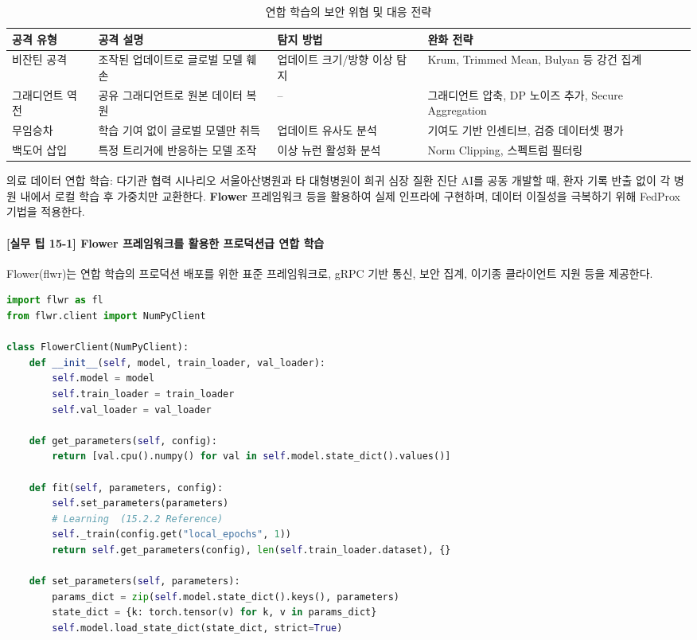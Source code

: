 \begin{table}[htbp]
\centering
\caption{연합 학습의 보안 위협 및 대응 전략}
\label{tab:fl_security_threats}
\begin{tabularx}{\textwidth}{p{2.5cm}Xp{3cm}X}
\toprule
\textbf{공격 유형} & \textbf{공격 설명} & \textbf{탐지 방법} & \textbf{완화 전략} \\
\midrule
비잔틴 공격 & 조작된 업데이트로 글로벌 모델 훼손 & 업데이트 크기/방향 이상 탐지 & Krum, Trimmed Mean, Bulyan 등 강건 집계 \\
그래디언트 역전 & 공유 그래디언트로 원본 데이터 복원 & -- & 그래디언트 압축, DP 노이즈 추가, Secure Aggregation \\
무임승차 & 학습 기여 없이 글로벌 모델만 취득 & 업데이트 유사도 분석 & 기여도 기반 인센티브, 검증 데이터셋 평가 \\
백도어 삽입 & 특정 트리거에 반응하는 모델 조작 & 이상 뉴런 활성화 분석 & Norm Clipping, 스펙트럼 필터링 \\
\bottomrule
\end{tabularx}
\end{table}

\begin{practicaltool}{의료 데이터 연합 학습: 다기관 협력 시나리오}
서울아산병원과 타 대형병원이 희귀 심장 질환 진단 AI를 공동 개발할 때, 환자 기록 반출 없이 각 병원 내에서 로컬 학습 후 가중치만 교환한다. \textbf{Flower} 프레임워크 등을 활용하여 실제 인프라에 구현하며, 데이터 이질성을 극복하기 위해 FedProx 기법을 적용한다.
\end{practicaltool}

\paragraph{[실무 팁 15-1] Flower 프레임워크를 활용한 프로덕션급 연합 학습}

Flower(flwr)는 연합 학습의 프로덕션 배포를 위한 표준 프레임워크로, gRPC 기반 통신, 보안 집계, 이기종 클라이언트 지원 등을 제공한다.

\begin{lstlisting}[language=Python, caption={Federated Learning Client Implementation based on Flower Framework}, label={lst:flower_client}]
import flwr as fl
from flwr.client import NumPyClient

class FlowerClient(NumPyClient):
    def __init__(self, model, train_loader, val_loader):
        self.model = model
        self.train_loader = train_loader
        self.val_loader = val_loader

    def get_parameters(self, config):
        return [val.cpu().numpy() for val in self.model.state_dict().values()]

    def fit(self, parameters, config):
        self.set_parameters(parameters)
        # Learning  (15.2.2 Reference)
        self._train(config.get("local_epochs", 1))
        return self.get_parameters(config), len(self.train_loader.dataset), {}

    def set_parameters(self, parameters):
        params_dict = zip(self.model.state_dict().keys(), parameters)
        state_dict = {k: torch.tensor(v) for k, v in params_dict}
        self.model.load_state_dict(state_dict, strict=True)
\end{lstlisting}

